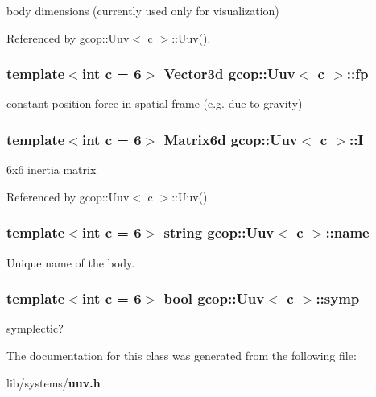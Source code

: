 body dimensions (currently used only for visualization) 



\-Referenced by gcop\-::\-Uuv$<$ c $>$\-::\-Uuv().

\subsubsection[{fp}]{\setlength{\rightskip}{0pt plus 5cm}template$<$int c = 6$>$ \-Vector3d {\bf gcop\-::\-Uuv}$<$ c $>$\-::{\bf fp}}\label{classgcop_1_1Uuv_a6a9263aa6c216de91d055604ca0f4a09}


constant position force in spatial frame (e.\-g. due to gravity) 

\subsubsection[{\-I}]{\setlength{\rightskip}{0pt plus 5cm}template$<$int c = 6$>$ {\bf \-Matrix6d} {\bf gcop\-::\-Uuv}$<$ c $>$\-::{\bf \-I}}\label{classgcop_1_1Uuv_a06da227c23aa28ec321ae81a232845c2}


6x6 inertia matrix 



\-Referenced by gcop\-::\-Uuv$<$ c $>$\-::\-Uuv().

\subsubsection[{name}]{\setlength{\rightskip}{0pt plus 5cm}template$<$int c = 6$>$ string {\bf gcop\-::\-Uuv}$<$ c $>$\-::{\bf name}}\label{classgcop_1_1Uuv_a5743bda149baa33d51d35c0ac0571e63}


\-Unique name of the body. 

\subsubsection[{symp}]{\setlength{\rightskip}{0pt plus 5cm}template$<$int c = 6$>$ bool {\bf gcop\-::\-Uuv}$<$ c $>$\-::{\bf symp}}\label{classgcop_1_1Uuv_a76e39a8f66aa5a9fa3020be199e31910}


symplectic? 



\-The documentation for this class was generated from the following file\-:\begin{DoxyCompactItemize}
\item 
lib/systems/{\bf uuv.\-h}\end{DoxyCompactItemize}
